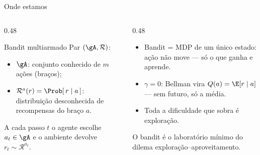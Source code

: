 \documentclass[aspectratio=169, 11pt]{beamer}
\begin{document}
\begin{frame}{Onde estamos}
  \begin{columns}[T]
    \begin{column}{0.48\textwidth}
      \begin{defbox}{Bandit multiarmado}
        Par $(\gA, \mathcal{R})$:
        \begin{itemize}\setlength{\itemsep}{0.2ex}
          \item $\gA$: conjunto \alert{conhecido} de $m$ ações (braços);
          \item $\mathcal{R}^a(r) = \Prob[\,r \mid a\,]$: distribuição
                \alert{desconhecida} de recompensas do braço $a$.
        \end{itemize}
        A cada passo $t$ o agente escolhe $a_t \in \gA$ e o ambiente
        devolve $r_t \sim \mathcal{R}^{a_t}$.
      \end{defbox}
    \end{column}
    \begin{column}{0.48\textwidth}
      \begin{itemize}
        \item Bandit = MDP de \alert{um único estado}: ação não move —
              só o que ganha e aprende.
        \item $\gamma=0$: Bellman vira $Q(a) = \E[r \mid a]$ — sem
              futuro, só a média.
        \item Toda a dificuldade que sobra é \alert{exploração}.
      \end{itemize}

      \begin{ideiabox}
        O bandit é o laboratório mínimo do dilema
        exploração--aproveitamento.
      \end{ideiabox}
    \end{column}
  \end{columns}
\end{frame}
\end{document}
